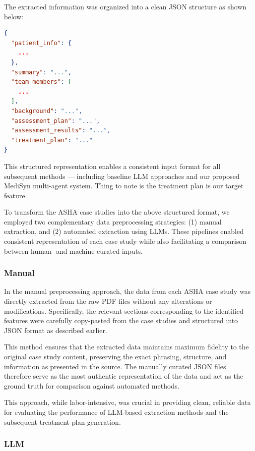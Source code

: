 \documentclass[pdflatex,sn-mathphys-num]{sn-jnl}%
\theoremstyle{thmstyleone}%
\theoremstyle{thmstyletwo}%
\theoremstyle{thmstylethree}%
\begin{document}
The extracted information was organized into a clean JSON structure as shown below:
\begin{lstlisting}[language=json, caption={Structure of extracted JSON from case study}, linewidth=\textwidth]
{
  "patient_info": {
    ...
  },
  "summary": "...",
  "team_members": [
    ...
  ],
  "background": "...",
  "assessment_plan": "...",
  "assessment_results": "...",
  "treatment_plan": "..."
}
\end{lstlisting}

This structured representation enables a consistent input format for all subsequent methods — including baseline LLM approaches and our proposed MediSyn multi-agent system. Thing to note is the treatment plan is our target feature.

To transform the ASHA case studies into the above structured format, we employed two complementary data preprocessing strategies: (1) manual extraction, and (2) automated extraction using LLMs. These pipelines enabled consistent representation of each case study while also facilitating a comparison between human- and machine-curated inputs.
\subsubsection{Manual}\label{subsec3.2.1}

In the manual preprocessing approach, the data from each ASHA case study was directly extracted from the raw PDF files without any alterations or modifications. Specifically, the relevant sections corresponding to the identified features were carefully copy-pasted from the case studies and structured into JSON format as described earlier.

This method ensures that the extracted data maintains maximum fidelity to the original case study content, preserving the exact phrasing, structure, and information as presented in the source. The manually curated JSON files therefore serve as the most authentic representation of the data and act as the ground truth for comparison against automated methods.

This approach, while labor-intensive, was crucial in providing clean, reliable data for evaluating the performance of LLM-based extraction methods and the subsequent treatment plan generation.

\subsubsection{LLM}\label{subsec3.2.2}
\end{document}
